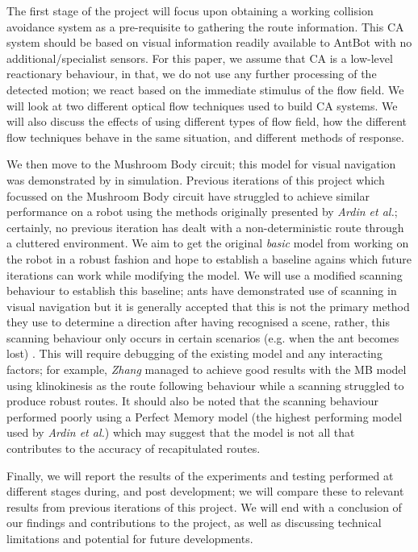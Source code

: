 \documentclass[a4paper,12pt]{article}
\begin{document}
The first stage of the project will focus upon obtaining a working collision avoidance system as a
pre-requisite to gathering the route information. This CA system should be based on visual
information readily available to AntBot with no additional/specialist sensors. For this paper, we
assume that CA is a low-level reactionary behaviour, in that, we do not use any further processing
of the detected motion; we react based on the immediate stimulus of the flow
field. We will look at two different optical flow techniques used to build CA systems. We will also
discuss the effects of using different types of flow field, how the different flow
techniques behave in the same situation, and different methods of response.
\newline

We then move to the Mushroom Body circuit; this model for visual navigation was demonstrated by
\cite{Ardin2016} in simulation. Previous iterations of this project which focussed on the Mushroom
Body circuit have struggled to achieve similar performance on a robot using the methods originally
presented by \textit{Ardin et al.}; certainly, no previous iteration
has dealt with a non-deterministic route through a cluttered environment. We aim to get the original
\textit{basic} model from \cite{Ardin2016} working on the robot in a robust fashion and hope to
establish a baseline agains which future iterations can work while modifying the model. We will use
a modified scanning behaviour to establish this baseline; ants have demonstrated use of scanning in
visual navigation but it is generally accepted that this
is not the primary method they use to determine a direction after having recognised a scene, rather,
this scanning behaviour only occurs in certain scenarios (e.g. when the ant becomes lost)
\cite{Kodzhabashev2015}. This will require debugging of the existing model and any interacting
factors; for example, \textit{Zhang} managed to achieve good results with the MB model using
klinokinesis as the route following behaviour while a scanning struggled to produce robust routes.
It should also be noted that the scanning behaviour performed poorly using a Perfect Memory model
(the highest performing model used by \textit{Ardin et al.}) which may suggest that the model is
not all that contributes to the accuracy of recapitulated routes.
\newline

Finally, we will report the results of the experiments and testing performed at different stages during, and
post development; we will compare these to relevant results from previous iterations of
this project. We will end with a conclusion of our findings and contributions to the project,
as well as discussing technical limitations and potential for future developments.
\newpage
\end{document}
